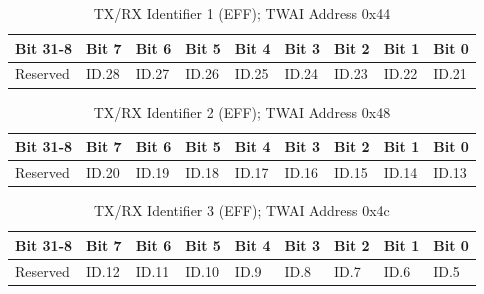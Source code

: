 \documentclass[main\_\_EN.tex]{subfiles}
\begin{document}
\begin{longtable}[c]{|p{1.4cm}|p{1.4cm}|p{1.4cm}|p{1.4cm}|p{1.4cm}|p{1.4cm}|p{1.4cm}|p{1.4cm}|p{1.4cm}|}
    \caption{TX/RX Identifier 1 (EFF); TWAI Address 0x44}
    \label{tab:twai-tx-rx-identifier-1-eff}\\
    \hline
       \rowcolor{lightgray}
    \textbf{Bit 31-8} & \textbf{Bit 7} & \textbf{Bit 6} & \textbf{Bit 5} & \textbf{Bit 4} & \textbf{Bit 3} & \textbf{Bit 2} & \textbf{Bit 1} & \textbf{Bit 0}\\\hline
    Reserved & ID.28 & ID.27 & ID.26 & ID.25 & ID.24 & ID.23 & ID.22 & ID.21\\
    \hline
\end{longtable}

\begin{longtable}[c]{|p{1.4cm}|p{1.4cm}|p{1.4cm}|p{1.4cm}|p{1.4cm}|p{1.4cm}|p{1.4cm}|p{1.4cm}|p{1.4cm}|}
    \caption{TX/RX Identifier 2 (EFF); TWAI Address 0x48}
    \label{tab:twai-tx-rx-identifier-2-eff}\\
    \hline
       \rowcolor{lightgray}
    \textbf{Bit 31-8} & \textbf{Bit 7} & \textbf{Bit 6} & \textbf{Bit 5} & \textbf{Bit 4} & \textbf{Bit 3} & \textbf{Bit 2} & \textbf{Bit 1} & \textbf{Bit 0}\\\hline
    Reserved & ID.20 & ID.19 & ID.18 & ID.17 & ID.16 & ID.15 & ID.14 & ID.13\\
    \hline
\end{longtable}

\begin{longtable}[c]{|p{1.4cm}|p{1.4cm}|p{1.4cm}|p{1.4cm}|p{1.4cm}|p{1.4cm}|p{1.4cm}|p{1.4cm}|p{1.4cm}|}
    \caption{TX/RX Identifier 3 (EFF); TWAI Address 0x4c}
    \label{tab:twai-tx-rx-identifier-3-eff}\\
    \hline
       \rowcolor{lightgray}
    \textbf{Bit 31-8} & \textbf{Bit 7} & \textbf{Bit 6} & \textbf{Bit 5} & \textbf{Bit 4} & \textbf{Bit 3} & \textbf{Bit 2} & \textbf{Bit 1} & \textbf{Bit 0}\\\hline
    Reserved & ID.12 & ID.11 & ID.10 & ID.9 & ID.8 & ID.7 & ID.6 & ID.5\\
    \hline
\end{longtable}
\end{document}
